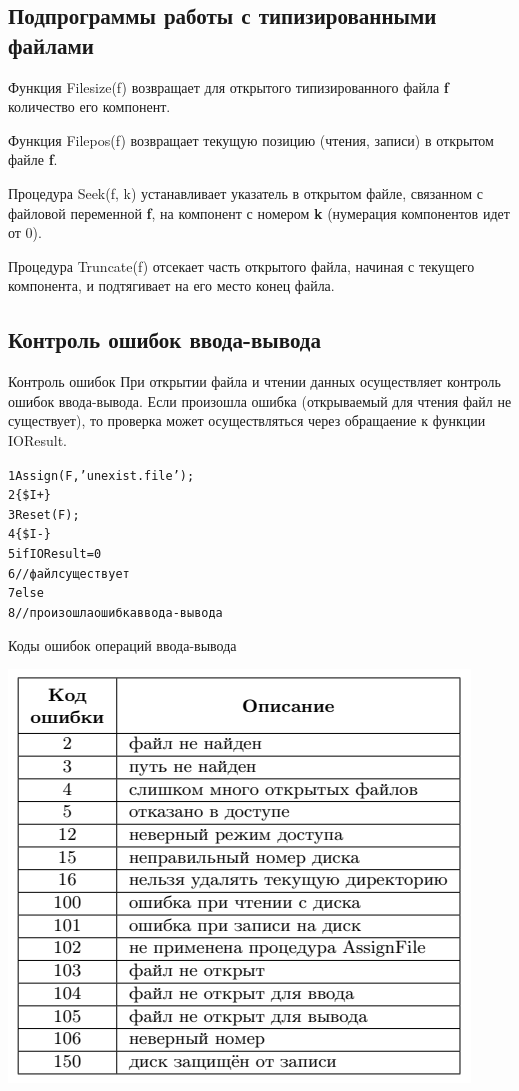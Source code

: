 \documentclass{beamer}
\begin{document}
\subsection{Подпрограммы работы с типизированными файлами}
\begin{frame}
\begin{block}{Функция Filesize(f)}
возвращает для открытого типизированного файла \textbf{f} количество его компонент.
\end{block}
\begin{block}{Функция Filepos(f)}
возвращает текущую позицию (чтения, записи) в открытом файле \textbf{f}.
\end{block}
\begin{block}{Процедура Seek(f, k)}
устанавливает указатель в открытом файле, связанном с файловой переменной \textbf{f}, на компонент с номером \textbf{k} (нумерация компонентов идет от 0).
\end{block}
\begin{block}{Процедура Truncate(f)}
отсекает часть открытого файла, начиная с текущего компонента, и подтягивает на его место
конец файла.
\end{block}
\end{frame}

\subsection{Контроль ошибок ввода-вывода}
\begin{frame}[fragile]{Контроль ошибок}
При открытии файла и чтении данных осуществляет контроль ошибок ввода-вывода. Если произошла ошибка (открываемый для чтения файл не существует), то проверка может осуществляться через обращаение к функции IOResult.
\begin{alltt}
 1 Assign(F, 'unexist.file');
 2 \{\$I+\}
 3 Reset(F);
 4 \{\$I-\} 
 5 if IOResult = 0
 6 //файл существует 
 7 else
 8 //произошла ошибка ввода-вывода
\end{alltt}
\end{frame}

\begin{frame}
\begin{block}{Коды ошибок операций ввода-вывода}
\begin{center}
\includegraphics[scale=0.6]{images/ioresult.png}
\end{center}
\end{block}
\end{frame}
\end{document}
